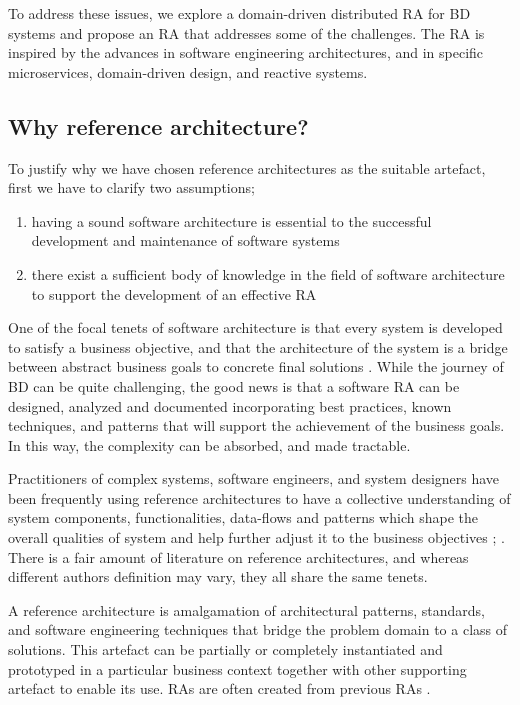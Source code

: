 \documentclass[review]{elsarticle}
\begin{document}
To address these issues, we explore a domain-driven distributed RA for BD systems and propose an RA that addresses some of the challenges. The RA is inspired by the advances in software engineering architectures, and in specific microservices, domain-driven design, and reactive systems. 

\subsection{Why reference architecture?}

To justify why we have chosen reference architectures as the suitable artefact, first we have to clarify two assumptions;

\begin{enumerate}
    \item having a sound software architecture is essential to the successful development and maintenance of software systems \cite{SoftwareArchitectureKazman}
    \item there exist a sufficient body of knowledge in the field of software architecture to support the development of an effective RA \cite{AtaeiACIS}
\end{enumerate}

One of the focal tenets of software architecture is that every system is developed to satisfy a business objective, and that the architecture of the system is a bridge between abstract business goals to concrete final solutions \cite{SoftwareArchitectureKazman}. While the journey of BD can be quite challenging, the good news is that a software RA can be designed, analyzed and documented incorporating best practices, known techniques, and patterns that will support the achievement of the business goals. In this way, the complexity can be absorbed, and made tractable.

Practitioners of complex systems, software engineers, and system designers have been frequently using reference architectures to have a collective understanding of system components, functionalities, data-flows and patterns which shape the overall qualities of system and help further adjust it to the business objectives \cite{Cloutier}; \cite{kohler2019towards}. There is a fair amount of literature on reference architectures, and whereas different authors definition may vary, they all share the same tenets.

A reference architecture is amalgamation of architectural patterns, standards, and software engineering techniques that bridge the problem domain to a class of solutions. This artefact can be partially or completely instantiated and prototyped in a particular business context together with other supporting artefact to enable its use. RAs are often created from previous RAs \cite{AtaeiACIS}.
\end{document}
